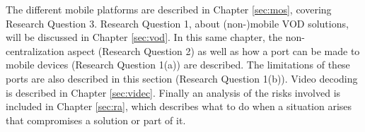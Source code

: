 The different mobile platforms are described in Chapter \ref{sec:mos}, covering Research Question 3. Research Question 1, about (non-)mobile VOD solutions, will be discussed in Chapter \ref{sec:vod}. In this same chapter, the non-centralization aspect (Research Question 2) as well as how a port can be made to mobile devices (Research Question 1(a)) are described. The limitations of these ports are also described in this section (Research Question 1(b)). Video decoding is described in Chapter \ref{sec:videc}. Finally an analysis of the risks involved is included in Chapter \ref{sec:ra}, which describes what to do when a situation arises that compromises a solution or part of it.